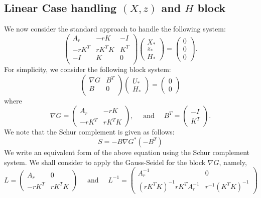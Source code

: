 \subsection{Linear Case handling $(X,z)$ and $H$ block} 
We now consider the standard approach to handle the following system: 
\begin{equation}
\begin{pmatrix}
A_r & - r K & -I \\
-r K^T& r K^TK & K^T\\
-I& K & 0\\
\end{pmatrix}
\begin{pmatrix}
X_*\\
z_* \\
H_*
\end{pmatrix} = 
\begin{pmatrix}
0\\
0\\
0
\end{pmatrix}. 
\end{equation}
For simplicity, we consider the following block system: 
\begin{equation}
\begin{pmatrix}
\nabla G  & B^T \\
B  & 0\\
\end{pmatrix} 
\begin{pmatrix}
U_* \\
H_*
\end{pmatrix} = 
\begin{pmatrix}
0\\
0
\end{pmatrix}
\end{equation}
where 
\begin{equation}
\nabla G = \begin{pmatrix}
A_r & -r K\\
-r K^T & rK^T K
\end{pmatrix}, \quad \mbox{ and } \quad 
B^T = \begin{pmatrix}
-I \\K^T
\end{pmatrix}.
\end{equation}
We note that the Schur complement is given as follows:   
\begin{equation}
S = -B \nabla G^{*} (-B^T) 
\end{equation}
We write an equivalent form of the above equation using the Schur complement system. We shall consider to apply the Gauss-Seidel for the block $\nabla G$, namely, 
\begin{equation}
L = \begin{pmatrix}
A_r & 0\\
-r K^T & rK^T K 
\end{pmatrix} 
\quad \mbox{ and } \quad L^{-1} = \begin{pmatrix}
A_r^{-1} & 0\\
(rK^T K)^{-1} rK^T A_r^{-1} & r^{-1} (K^T K)^{-1} 
\end{pmatrix} 
\end{equation}

